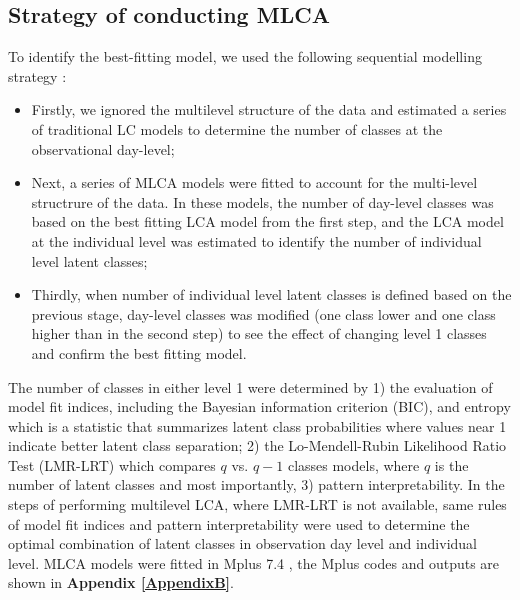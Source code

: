 \subsection{Strategy of conducting MLCA}\vspace{-0.3cm}

To identify the best-fitting model, we used the following sequential modelling strategy \parencite{henry2010multilevel}: 

\begin{itemize}
	\item Firstly, we ignored the multilevel structure of the data and estimated a series of traditional LC models to determine the number of classes at the observational day-level;
	\item Next, a series of MLCA models were fitted to account for the multi-level structrure of the data. In these models, the number of day-level classes was based on the best fitting LCA model from the first step, and the LCA model at the individual level was estimated to identify the number of individual level latent classes;
	\item Thirdly, when number of individual level latent classes is defined based on the previous stage, day-level classes was modified (one class lower and one class higher than in the second step) to see the effect of changing level 1 classes and confirm the best fitting model.
\end{itemize}

The number of classes in either level 1 were determined by 1) the evaluation of model fit indices, including the Bayesian information criterion (BIC), and entropy which is a statistic that summarizes latent class probabilities where values near 1 indicate better latent class separation; 2) the Lo-Mendell-Rubin Likelihood Ratio Test (LMR-LRT) \parencite{lo2001testing, nylund2007deciding} which compares $q$ vs. $q-1$ classes models, where $q$ is the number of latent classes and most importantly, 3) pattern interpretability. In the steps of performing multilevel LCA, where LMR-LRT is not available, same rules of model fit indices and pattern interpretability were used to determine the optimal combination of latent classes in observation day level and individual level. MLCA models were fitted in Mplus 7.4 \parencite{muthen2005mplus}, the Mplus codes and outputs are shown in \textbf{Appendix \ref{AppendixB}}. \vspace{-0.3cm}




